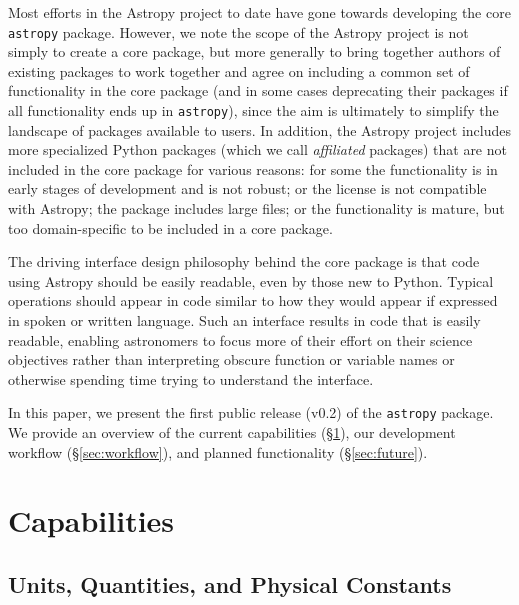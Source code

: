 \documentclass[traditabstract]{aa}
\newcommand{\astropy}{\texttt{astropy}\xspace}
\begin{document}
Most efforts in the Astropy project to date have gone towards developing the
core \astropy package. However, we note the scope of the Astropy project is
not simply to create a core package, but more generally to bring together
authors of existing packages to work together and agree on including a common
set of functionality in the core package (and in some cases deprecating their
packages if all functionality ends up in \astropy), since the aim is
ultimately to simplify the landscape of packages available to users. In
addition, the Astropy project includes more specialized Python packages (which
we call \textit{affiliated} packages) that are not included in the core
package for various reasons: for some the functionality is in early stages of
development and is not robust; or the license is not compatible with Astropy;
the package includes large files; or the functionality is mature, but too
domain-specific to be included in a core package.

The driving interface design philosophy behind the core package is that code using Astropy should be easily
readable, even by those new to Python. Typical operations should appear in
code similar to how they would appear if expressed in spoken or written
language. Such an interface results in code that is easily readable, enabling
astronomers to focus more of their effort on their science objectives rather
than interpreting obscure function or variable names or otherwise spending
time trying to understand the interface.

In this paper, we present the first public release (v0.2) of the \astropy
package. We provide an overview of the current capabilities
(\S\ref{sec:capabilities}), our development workflow (\S\ref{sec:workflow}),
and planned functionality (\S\ref{sec:future}).


\section{Capabilities}

\label{sec:capabilities}

\subsection{Units, Quantities, and Physical Constants}

\end{document}

